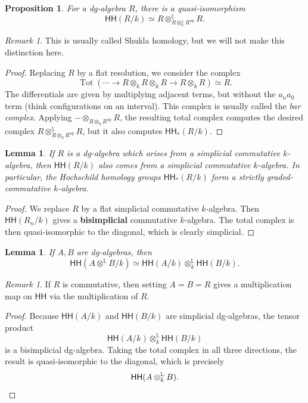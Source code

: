 \documentclass[10pt, oneside]{memoir}
\newtheorem{prop}[thm]{Proposition}
\newtheorem{lem}[thm]{Lemma}
\theoremstyle{definition}
\theoremstyle{remark}
\newtheorem{rmk}[thm]{Remark}
\theoremstyle{plain}
\theoremstyle{definition}
\theoremstyle{remark}
\renewcommand{\L}{\mathbb{L}}
\newcommand{\mr}[1]{\mathrm{#1}}
\newcommand{\ms}[1]{\mathsf{#1}}
\newcommand{\1}{\mathbf{1}}
\newcommand{\2}{\mathbf{2}}
\newcommand{\3}{\mathbf{3}}
\newcommand{\HH}{\ms{HH}}
\DeclareMathOperator{\op}{op}
\DeclareMathOperator{\Tot}{Tot}
\begin{document}
\begin{prop}
    For a dg-algebra \(R \), there is a quasi-isomorphism
    \[ \HH(R/k) \simeq R \otimes_{R \otimes_k^{\L} R^{\mr{op}}}^{\L} R. \]
\end{prop}

\begin{rmk}
    This is usually called Shukla homology, but we will not make this distinction here.
\end{rmk}

\begin{proof}
    Replacing \(R \) by a flat resolution, we consider the complex
    \[ \Tot(\cdots \to R \otimes_k R \otimes_k R \to R \otimes_k R) \simeq R. \]
    The differentials are given by multiplying adjacent terms, but without the \(a_n a_0 \) term (think configurations on an interval). This complex is usually called the \textit{bar complex}. Applying \(- \otimes_{R \otimes_k R^{\op}} R \), the resulting total complex computes the desired complex \(R \otimes_{R \otimes_k R^{\op}}^{\L} R \), but it also computes \(\HH_*(R/k) \).
\end{proof}

\begin{lem}
    If \(R \) is a dg-algebra which arises from a simplicial commutative \(k \)-algebra, then \(\HH(R/k) \) also comes from a simplicial commutative \(k \)-algebra. In particular, the Hochschild homology groups \(\HH_*(R/k) \) form a strictly graded-commutative \(k \)-algebra.
\end{lem}

\begin{proof}
    We replace \(R \) by a flat simplicial commutative \(k \)-algebra. Then \(\HH(R_n/k) \) gives a \textbf{bisimplicial} commutative \(k \)-algebra. The total complex is then quasi-isomorphic to the diagonal, which is clearly simplicial.
\end{proof}

\begin{lem}
    If \(A, B \) are dg-algebras, then
    \[ \HH(A \otimes^{\L} B/k) \simeq \HH(A/k) \otimes_k^{\L} \HH(B/k). \]
\end{lem}

\begin{rmk}
    If \(R \) is commutative, then setting \(A=B=R \) gives a multiplication map on \(\HH \) via the multiplication of \(R \).
\end{rmk}

\begin{proof}
    Because \(\HH(A/k) \) and \(\HH(B/k) \) are simplicial dg-algebras, the tensor product
    \[ \HH(A/k) \otimes_k^{\L} \HH(B/k) \]
    is a bisimplicial dg-algebra. Taking the total complex in all three directions, the result is quasi-isomorphic to the diagonal, which is precisely
    \[ \HH(A\otimes_k^{\L} B). \qedhere \]
\end{proof}
\end{document}
